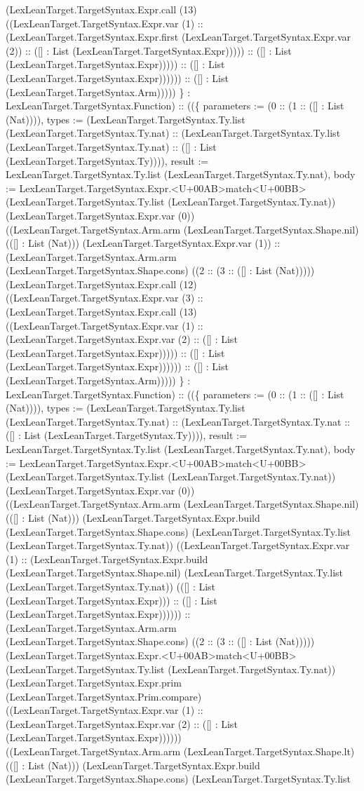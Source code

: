 \documentclass[11pt]{article}
\begin{document}
(LexLeanTarget.TargetSyntax.Expr.call (13) ((LexLeanTarget.TargetSyntax.Expr.var (1) :: (LexLeanTarget.TargetSyntax.Expr.first (LexLeanTarget.TargetSyntax.Expr.var (2)) :: ([] : List (LexLeanTarget.TargetSyntax.Expr))))) :: ([] : List (LexLeanTarget.TargetSyntax.Expr))))) :: ([] : List (LexLeanTarget.TargetSyntax.Expr)))))) :: ([] : List (LexLeanTarget.TargetSyntax.Arm))))) \} : LexLeanTarget.TargetSyntax.Function) :: ((\{ parameters := (0 :: (1 :: ([] : List (Nat)))), types := (LexLeanTarget.TargetSyntax.Ty.list (LexLeanTarget.TargetSyntax.Ty.nat) :: (LexLeanTarget.TargetSyntax.Ty.list (LexLeanTarget.TargetSyntax.Ty.nat) :: ([] : List (LexLeanTarget.TargetSyntax.Ty)))), result := LexLeanTarget.TargetSyntax.Ty.list (LexLeanTarget.TargetSyntax.Ty.nat), body := LexLeanTarget.TargetSyntax.Expr.<U+00AB>match<U+00BB> (LexLeanTarget.TargetSyntax.Ty.list (LexLeanTarget.TargetSyntax.Ty.nat)) (LexLeanTarget.TargetSyntax.Expr.var (0)) ((LexLeanTarget.TargetSyntax.Arm.arm (LexLeanTarget.TargetSyntax.Shape.nil) (([] : List (Nat))) (LexLeanTarget.TargetSyntax.Expr.var (1)) :: (LexLeanTarget.TargetSyntax.Arm.arm (LexLeanTarget.TargetSyntax.Shape.cons) ((2 :: (3 :: ([] : List (Nat))))) (LexLeanTarget.TargetSyntax.Expr.call (12) ((LexLeanTarget.TargetSyntax.Expr.var (3) :: (LexLeanTarget.TargetSyntax.Expr.call (13) ((LexLeanTarget.TargetSyntax.Expr.var (1) :: (LexLeanTarget.TargetSyntax.Expr.var (2) :: ([] : List (LexLeanTarget.TargetSyntax.Expr))))) :: ([] : List (LexLeanTarget.TargetSyntax.Expr)))))) :: ([] : List (LexLeanTarget.TargetSyntax.Arm))))) \} : LexLeanTarget.TargetSyntax.Function) :: ((\{ parameters := (0 :: (1 :: ([] : List (Nat)))), types := (LexLeanTarget.TargetSyntax.Ty.list (LexLeanTarget.TargetSyntax.Ty.nat) :: (LexLeanTarget.TargetSyntax.Ty.nat :: ([] : List (LexLeanTarget.TargetSyntax.Ty)))), result := LexLeanTarget.TargetSyntax.Ty.list (LexLeanTarget.TargetSyntax.Ty.nat), body := LexLeanTarget.TargetSyntax.Expr.<U+00AB>match<U+00BB> (LexLeanTarget.TargetSyntax.Ty.list (LexLeanTarget.TargetSyntax.Ty.nat)) (LexLeanTarget.TargetSyntax.Expr.var (0)) ((LexLeanTarget.TargetSyntax.Arm.arm (LexLeanTarget.TargetSyntax.Shape.nil) (([] : List (Nat))) (LexLeanTarget.TargetSyntax.Expr.build (LexLeanTarget.TargetSyntax.Shape.cons) (LexLeanTarget.TargetSyntax.Ty.list (LexLeanTarget.TargetSyntax.Ty.nat)) ((LexLeanTarget.TargetSyntax.Expr.var (1) :: (LexLeanTarget.TargetSyntax.Expr.build (LexLeanTarget.TargetSyntax.Shape.nil) (LexLeanTarget.TargetSyntax.Ty.list (LexLeanTarget.TargetSyntax.Ty.nat)) (([] : List (LexLeanTarget.TargetSyntax.Expr))) :: ([] : List (LexLeanTarget.TargetSyntax.Expr)))))) :: (LexLeanTarget.TargetSyntax.Arm.arm (LexLeanTarget.TargetSyntax.Shape.cons) ((2 :: (3 :: ([] : List (Nat))))) (LexLeanTarget.TargetSyntax.Expr.<U+00AB>match<U+00BB> (LexLeanTarget.TargetSyntax.Ty.list (LexLeanTarget.TargetSyntax.Ty.nat)) (LexLeanTarget.TargetSyntax.Expr.prim (LexLeanTarget.TargetSyntax.Prim.compare) ((LexLeanTarget.TargetSyntax.Expr.var (1) :: (LexLeanTarget.TargetSyntax.Expr.var (2) :: ([] : List (LexLeanTarget.TargetSyntax.Expr)))))) ((LexLeanTarget.TargetSyntax.Arm.arm (LexLeanTarget.TargetSyntax.Shape.lt) (([] : List (Nat))) (LexLeanTarget.TargetSyntax.Expr.build (LexLeanTarget.TargetSyntax.Shape.cons) (LexLeanTarget.TargetSyntax.Ty.list 
\end{document}
